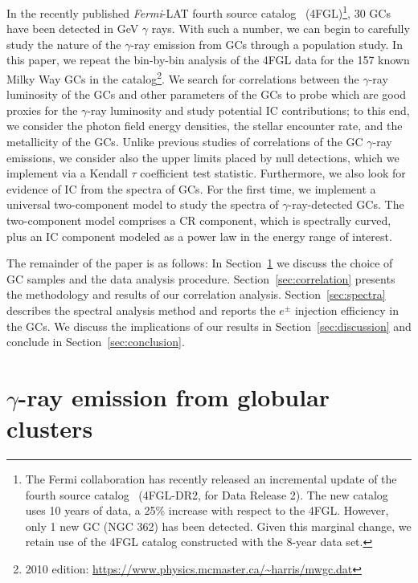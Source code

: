 \documentclass[doublespace,draft,nopageskip]{VTthesis} %
\begin{document}
In the recently published \textit{Fermi}-LAT fourth source catalog~\citep{2020ApJS..247...33A} (4FGL)\footnote{The Fermi collaboration has recently released an incremental update of the fourth source catalog~\citep{2020arXiv200511208B} (4FGL-DR2, for Data Release 2). The new catalog uses 10 years of data, a 25\% increase with respect to the 4FGL. However, only 1 new GC (NGC 362) has been detected. Given this marginal change, we retain use of the 4FGL catalog constructed with the 8-year data set.}, 30 GCs have been detected in GeV $\gamma$ rays. With such a number, we can begin to carefully study the nature of the $\gamma$-ray emission from GCs through a population study. In this paper, we repeat the bin-by-bin analysis of the 4FGL data for the 157 known Milky Way GCs in the \citet{1996AJ....112.1487H} catalog\footnote{2010  edition: \url{https://www.physics.mcmaster.ca/~harris/mwgc.dat}}. We search for correlations between the $\gamma$-ray luminosity of the GCs and other parameters of the GCs to probe which are good proxies for the $\gamma$-ray luminosity and study potential IC contributions; to this end, we consider the photon field energy densities, the stellar encounter rate, and the metallicity of the GCs. Unlike previous studies of correlations of the GC $\gamma$-ray emissions, we consider also the upper limits placed by null detections, which we implement via a Kendall $\tau$ coefficient test statistic. Furthermore, we also look for evidence of IC from the spectra of GCs. For the first time, we implement a universal two-component model to study the spectra of $\gamma$-ray-detected GCs. The two-component model comprises a CR component, which is spectrally curved, plus an IC component modeled as a power law in the energy range of interest.

The remainder of the paper is as follows: In Section~\ref{sec:gamma_GCs} we discuss the choice of GC samples and the data analysis procedure. Section~\ref{sec:correlation} presents the methodology and results of our correlation analysis. Section~\ref{sec:spectra} describes the spectral analysis method and reports the $e^\pm$ injection efficiency in the GCs. We discuss the implications of our results in Section~\ref{sec:discussion} and conclude in Section~\ref{sec:conclusion}.

\section{$\gamma$-ray emission from globular clusters}\label{sec:gamma_GCs}
\end{document}
